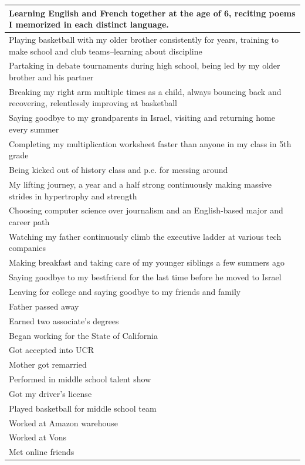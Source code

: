 \documentclass[
  .7em,
  letterpaper,
  DIV=11,
  numbers=noendperiod]{scrartcl}
\begin{document}
\begin{table}
\begin{tabular}{l}
\hline
Learning English and French together at the age of 6, reciting poems I memorized in each distinct language.\\
\hline
Playing basketball with my older brother consistently for years, training to make school and club teams--learning about discipline\\
\hline
Partaking in debate tournaments during high school, being led by my older brother and his partner\\
\hline
Breaking my right arm multiple times as a child, always bouncing back and recovering, relentlessly improving at basketball\\
\hline
Saying goodbye to my grandparents in Israel, visiting and returning home every summer\\
\hline
Completing my multiplication worksheet faster than anyone in my class in 5th grade\\
\hline
Being kicked out of history class and p.e. for messing around\\
\hline
My lifting journey, a year and a half strong continuously making massive strides in hypertrophy and strength\\
\hline
Choosing computer science over journalism and an English-based major and career path\\
\hline
Watching my father continuously climb the executive ladder at various tech companies\\
\hline
Making breakfast and taking care of my younger siblings a few summers ago\\
\hline
Saying goodbye to my bestfriend for the last time before he moved to Israel\\
\hline
Leaving for college and saying goodbye to my friends and family\\
\hline
Father passed away\\
\hline
Earned two associate's degrees\\
\hline
Began working for the State of California\\
\hline
Got accepted into UCR\\
\hline
Mother got remarried\\
\hline
Performed in middle school talent show\\
\hline
Got my driver's license\\
\hline
Played basketball for middle school team\\
\hline
Worked at Amazon warehouse\\
\hline
Worked at Vons\\
\hline
Met online friends\\

\end{tabular}
\end{table}
\end{document}

